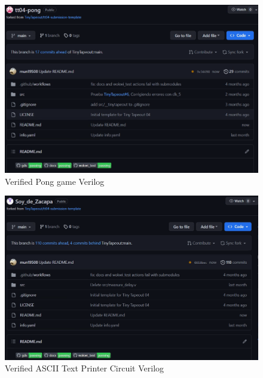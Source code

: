 \begin{figure}[H]
    \centering
    \includegraphics[width=\linewidth]{Pictures/pong.png}
    \caption{Verified Pong game Verilog}
    \label{fig:enter-label}
\end{figure}

\begin{figure}[H]
    \centering
    \includegraphics[width=\linewidth]{Pictures/verifide_zacapa.png}
    \caption{Verified ASCII Text Printer Circuit Verilog}
    \label{fig:enter-label}
\end{figure}

